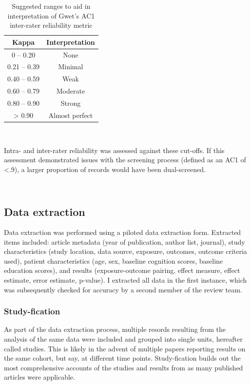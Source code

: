 \documentclass[a4paper, twoside]{templates/ociamthesis}
\begin{document}
\begin{table}[H]

\caption[Ranges for Gwet's AC1]{\label{tab:gwet-table}Suggested ranges to aid in interpretation of Gwet's AC1 inter-rater reliability metric}
\centering
\begin{tabular}[t]{cc}
\toprule
\textbf{Kappa} & \textbf{Interpretation}\\
\midrule
0    – 0.20 & None\\
\midrule
0.21 – 0.39 & Minimal\\
\midrule
0.40 – 0.59 & Weak\\
\midrule
0.60 – 0.79 & Moderate\\
\midrule
0.80 – 0.90 & Strong\\
\midrule
\addlinespace
> 0.90 & Almost perfect\\
\bottomrule
\end{tabular}
\end{table}

~

Intra- and inter-rater reliability was assessed against these cut-offs. If this assessment demonstrated issues with the screening process (defined as an AC1 of \textless.9), a larger proportion of records would have been dual-screened.

~

\hypertarget{data-extraction}{%
\subsection{Data extraction}\label{data-extraction}}

Data extraction was performed using a piloted data extraction form. Extracted items included: article metadata (year of publication, author list, journal), study characteristics (study location, data source, exposure, outcomes, outcome criteria used), patient characteristics (age, sex, baseline cognition scores, baseline education scores), and results (exposure-outcome pairing, effect measure, effect estimate, error estimate, p-value). I extracted all data in the first instance, which was subsequently checked for accuracy by a second member of the review team.

\hypertarget{study-fication}{%
\subsubsection{Study-fication}\label{study-fication}}

As part of the data extraction process, multiple resords resulting from the analysis of the same data were included and grouped into single units, hereafter called studies. This is likely in the advent of multiple papers reporting results on the same cohort, but say, at different time points. Study-fication builds out the most comprehensive accounts of the studies and results from as many published articles were applicable.
\end{document}
